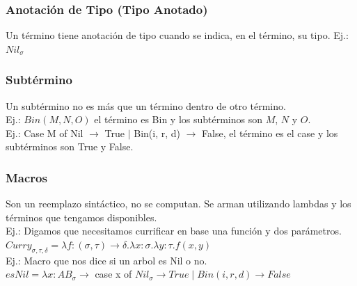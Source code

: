 \documentclass[10pt,a4paper]{article}
\begin{document}
\subsubsection*{Anotación de Tipo (Tipo Anotado)}
Un término tiene anotación de tipo cuando se indica, en el término, su tipo. Ej.: $Nil_{\sigma}$
\subsubsection*{Subtérmino}
Un subtérmino no es más que un término dentro de otro término. \\
Ej.: $Bin(M, N, O)$ el término es Bin y los subtérminos son $M$, $N$ y $O$. \\
Ej.: Case M of Nil $\rightarrow$ True $\mid$ Bin(i, r, d) $\rightarrow$ False, el término es el case y los subtérminos son True y False.
\subsubsection*{Macros}
Son un reemplazo sintáctico, no se computan. Se arman utilizando lambdas y los términos que tengamos disponibles. \\
Ej.: Digamos que necesitamos currificar en base una función y dos parámetros. \\
$Curry_{\sigma, \tau, \delta} = \lambda f:(\sigma, \tau) \rightarrow \delta . \lambda x:\sigma .\lambda y:\tau . f(x,y)$ \\
Ej.: Macro que nos dice si un arbol es Nil o no. \\
$esNil = \lambda x: AB_{\sigma} \rightarrow$ case x of $Nil_{\sigma} \rightarrow True \mid Bin(i, r, d) \rightarrow False$
\end{document}
